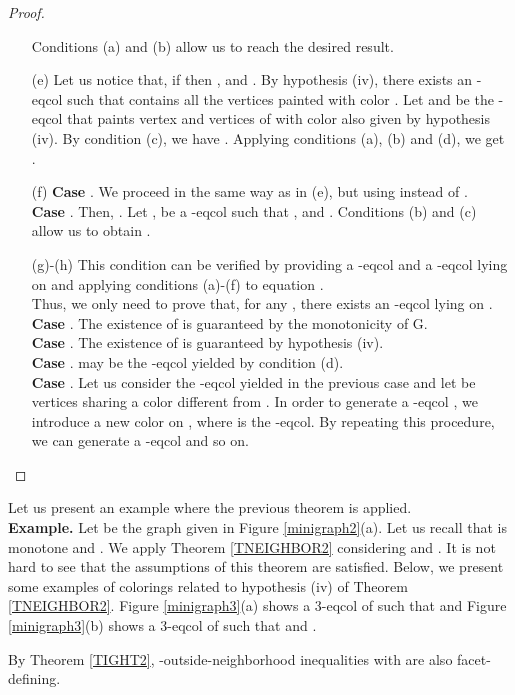 \begin{proof}
\begin{enumerate}
Conditions (a) and (b) allow us to reach the desired result.
\item[(e)] Let us notice that, if  then
,  and
. By hypothesis (iv), there exists an -eqcol
 such that  contains all the vertices painted with color . Let  and
 be the -eqcol that paints vertex  and  vertices of
 with color  also given by hypothesis (iv).
By condition (c), we have .
Applying conditions (a), (b) and (d), we get
.
\item[(f)] \textbf{Case }. We proceed in the same way as in (e),
but using  instead of .\\
\textbf{Case }. Then, . Let ,  be a
-eqcol such that ,  and .
Conditions (b) and (c) allow us to obtain .
\item[(g)-(h)] This condition can be verified by providing a -eqcol  and a -eqcol
 lying on  and applying conditions (a)-(f) to equation .\\
Thus, we only need to prove that, for any , there exists an -eqcol  lying on  .\\ 
\textbf{Case }. The existence of  is guaranteed by the monotonicity of G.\\
\textbf{Case }. The existence of  is guaranteed by hypothesis (iv).\\
\textbf{Case }.  may be the -eqcol yielded by condition (d).\\
\textbf{Case }. Let us consider the
-eqcol yielded in the previous case and let  be vertices sharing a color
different from . In order to generate a -eqcol , we introduce a new color on ,
\ie  where  is the -eqcol. By repeating this
procedure, we can generate a -eqcol and so on.
\end{enumerate}
\end{proof}

Let us present an example where the previous theorem is applied.\\

\noindent \textbf{Example.} Let  be the graph given in Figure \ref{minigraph2}(a). Let us recall that  is
monotone and .
We apply Theorem \ref{TNEIGHBOR2} considering  and . It is not hard to see that the assumptions of
this theorem are satisfied. Below, we present some examples of colorings related to hypothesis (iv) of
Theorem \ref{TNEIGHBOR2}. Figure \ref{minigraph3}(a) shows a 3-eqcol of  such that 
and Figure \ref{minigraph3}(b) shows a 3-eqcol of  such that  and .


By Theorem \ref{TIGHT2}, -outside-neighborhood inequalities with  are also facet-defining.


